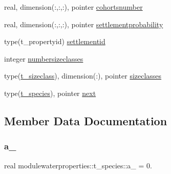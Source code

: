 \begin{DoxyCompactItemize}
real, dimension(\+:,\+:,\+:), pointer \mbox{\hyperlink{structmodulewaterproperties_1_1t__species_a7ad9b9ff5063f17f65b49a52f00151ee}{cohortsnumber}}
\item 
real, dimension(\+:,\+:,\+:), pointer \mbox{\hyperlink{structmodulewaterproperties_1_1t__species_afa1f4fff4beba6bf6e8e96fc0fb7d555}{settlementprobability}}
\item 
type(t\+\_\+propertyid) \mbox{\hyperlink{structmodulewaterproperties_1_1t__species_a9c55a028d607fe114b0fec2d14773302}{settlementid}}
\item 
integer \mbox{\hyperlink{structmodulewaterproperties_1_1t__species_a5414f3eb4d5486104eeb5c066590d256}{numbersizeclasses}}
\item 
type(\mbox{\hyperlink{structmodulewaterproperties_1_1t__sizeclass}{t\+\_\+sizeclass}}), dimension(\+:), pointer \mbox{\hyperlink{structmodulewaterproperties_1_1t__species_ad331ade99a7027e9f170488b377e37ef}{sizeclasses}}
\item 
type(\mbox{\hyperlink{structmodulewaterproperties_1_1t__species}{t\+\_\+species}}), pointer \mbox{\hyperlink{structmodulewaterproperties_1_1t__species_ad7eddd9f6192888993ce0d318f5fb74a}{next}}
\end{DoxyCompactItemize}


\subsection{Member Data Documentation}
\mbox{\label{structmodulewaterproperties_1_1t__species_a092f4215a83e8c3a65bed83d49e9ad51}} 
\subsubsection{\texorpdfstring{a\+\_}{a\_0}}
{\footnotesize\ttfamily real modulewaterproperties\+::t\+\_\+species\+::a\+\_ = 0.\hspace{0.3cm}{\ttfamily [private]}}

\mbox{\label{structmodulewaterproperties_1_1t__species_a46a8cb457191e90de750642c7177d7cf}} 
